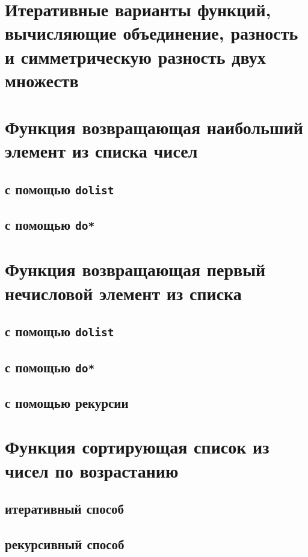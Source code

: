 \section{Итеративные варианты функций, вычисляющие объединение, разность и симметрическую разность двух множеств}




\section{Функция возвращающая наибольший элемент из списка чисел}

\subsection{с помощью \texttt{dolist}}



\subsection{с помощью \texttt{do*}}




\section{Функция возвращающая первый нечисловой элемент из списка}

\subsection{с помощью \texttt{dolist}}



\subsection{с помощью \texttt{do*}}



\subsection{с помощью рекурсии}




\section{Функция сортирующая список из чисел по возрастанию}

\subsection{итеративный способ}



\subsection{рекурсивный способ}

